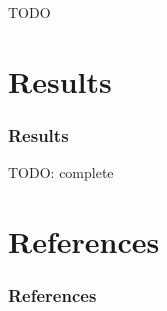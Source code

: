 \documentclass{beamer}
\begin{document}
\begin{frame}
  TODO
\end{frame}



\section{Results}

\begin{frame}
  \frametitle{Results}
  TODO: complete
\end{frame}


\section*{References}

\begin{frame}
  \frametitle{References}
  
  
\end{frame}
\end{document}
